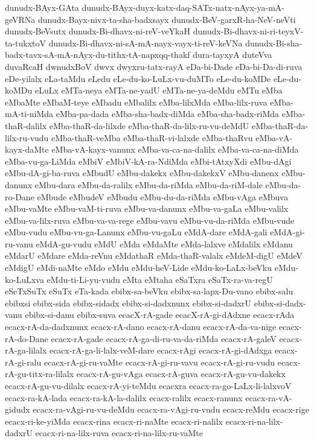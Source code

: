 {dunudx-BAyx-GAta
dunudx-BAyx-duyx-katx-daq-SATx-natx-nAyx-ya-mA-geVRNa
dunudx-Bayx-nivx-ta-sha-badxsayx
dunudx-BeV-garxR-ha-NeV-neVti
dunudx-BeVsutx
dunudx-Bi-dhavx-ni-reV-veYkaH
dunudx-Bi-dhavx-ni-ri-teyxV-ta-tukxtoV
dunudx-Bi-dhavx-ni-sA-mA-nayx-vayx-ti-reV-keVNa
dunudx-Bi-sha-badx-tavx-sA-mA-nAyx-du-tithx-tA-napxqq-thakf
dura-tayxyA
duteVva
duvaRcaH
dwnudxBoV
dwvx
dwyxru-tatx-rayA
eDa-bi-Dade
eDa-bi-Da-di-ruva
eDe-yilalx
eLa-taMdu
eLedu
eLe-du-ko-LuLx-vu-duMTo
eLe-du-koMDe
eLe-du-koMDu
eLuLx
eMTa-neya
eMTa-ne-yadU
eMTa-ne-ya-deMdu
eMTu
eMba
eMbaMte
eMbaM-teye
eMbadu
eMbalilx
eMba-lilxMda
eMba-lilx-ruva
eMba-mA-ti-niMda
eMba-pa-dada
eMba-sha-badx-diMda
eMba-sha-badx-riMda
eMba-thaR-dalilx
eMba-thaR-da-lilxde
eMba-thaR-da-lilx-ru-vu-deMdU
eMba-thaR-da-lilx-ru-vudu
eMba-thaR-veMba
eMba-thaR-vi-lalxde
eMba-thaRvu
eMba-vA-kayx-daMte
eMba-vA-kayx-vanunx
eMba-va-ca-na-dalilx
eMba-va-ca-na-diMda
eMba-vu-ga-LiMda
eMbiV
eMbiV-kA-ra-NdiMda
eMbi-tAtxyXdi
eMbu-dAgi
eMbu-dA-gi-ba-ruva
eMbudU
eMbu-dakekx
eMbu-dakekxV
eMbu-danenx
eMbu-danunx
eMbu-dara
eMbu-da-ralilx
eMbu-da-riMda
eMbu-da-riM-dale
eMbu-da-ro-Dane
eMbude
eMbudeV
eMbudu
eMbu-du-da-riMda
eMbu-vAga
eMbuva
eMbu-vaMte
eMbu-vaM-ti-ruva
eMbu-va-danunx
eMbu-va-gaLa
eMbu-valilx
eMbu-va-lilx-ruva
eMbu-va-va-rege
eMbu-vavu
eMbu-vu-da-riMda
eMbu-vude
eMbu-vudu
eMbu-vu-ga-Lanunx
eMbu-vu-gaLu
eMdA-dare
eMdA-gali
eMdA-gi-ru-vanu
eMdA-gu-vudu
eMdU
eMda
eMdaMte
eMda-lalxve
eMdalilx
eMdanu
eMdarU
eMdare
eMda-reVnu
eMdathaR
eMda-thaR-valalx
eMdeM-digU
eMdeV
eMdigU
eMdi-naMte
eMdo
eMdu
eMdu-heV-Lide
eMdu-ko-LaLx-beVku
eMdu-ko-LuLxva
eMdu-ti-Li-yu-vudu
eMta
eMtaha
eSaTxra
eSaTx-ra-va-regU
eSeTxSuTx
eSuTx
eTa-kada
ebibx-sa-beVku
ebibx-sa-lapx-Du-vano
ebibx-salu
ebibxsi
ebibx-sida
ebibx-sidadx
ebibx-si-dadxnunx
ebibx-si-dadxrU
ebibx-si-dadx-vanu
ebibx-si-danu
ebibx-suva
ecacX-rA-gade
ecacX-rA-gi-dAdxne
ecacx-rAda
ecacx-rA-da-dadxnunx
ecacx-rA-dano
ecacx-rA-danu
ecacx-rA-da-va-nige
ecacx-rA-do-Dane
ecacx-rA-gade
ecacx-rA-ga-di-ru-va-da-riMda
ecacx-rA-galeV
ecacx-rA-ga-lilalx
ecacx-rA-ga-li-lalx-veM-dare
ecacx-rAgi
ecacx-rA-gi-dAdxga
ecacx-rA-gi-ralu
ecacx-rA-gi-ru-vaMte
ecacx-rA-gi-ru-vavu
ecacx-rA-gi-ru-vudu
ecacx-rA-gu-titx-ra-lilalx
ecacx-rA-gu-vAga
ecacx-rA-guva
ecacx-rA-gu-vu-dakekx
ecacx-rA-gu-vu-dilalx
ecacx-rA-yi-teMdu
ecacxra
ecacx-ra-go-LaLx-li-lalxvoV
ecacx-ra-kA-lada
ecacx-ra-kA-la-dalilx
ecacx-ralilx
ecacx-ranunx
ecacx-ra-vA-gidudx
ecacx-ra-vAgi-ru-vu-deMdu
ecacx-ra-vAgi-ru-vudu
ecacx-reMdu
ecacx-rige
ecacx-ri-ke-yiMda
ecacx-rina
ecacx-ri-naMte
ecacx-ri-nalilx
ecacx-ri-na-lilx-dadxrU
ecacx-ri-na-lilx-ruva
ecacx-ri-na-lilx-ru-vaMte
}
